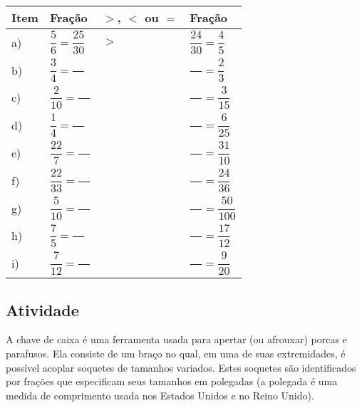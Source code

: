\documentclass[a4,12pt]{book}
\begin{document}
\begin{center}
  \begin{longtable}{|	m{}|m{}|m{}|m{}|}
    \hline
     Item &  Fração &  $>$, $<$ ou $=$ &  Fração \\
    \hline \hline
     a) & \parbox[b][1.2cm][c]{3cm}{ $\dfrac{5}{6} = \dfrac{25}{30}$ } &   $>$  &  $\dfrac{24}{30} = \dfrac{4}{5}$ \\
    \hline
     b) & \parbox[b][1.2cm][c]{3cm}{ $\dfrac{3}{4} = \dfrac{\quad }{\quad }$} &   &  $\dfrac{\quad}{\quad} = \dfrac{2}{3}$ \\
    \hline
     c) &  \parbox[b][1.2cm][c]{3cm}{$\dfrac{2}{10} = \dfrac{\quad }{\quad }$} &   &  $\dfrac{\quad}{\quad} = \dfrac{3}{15}$ \\
    \hline
     d) & \parbox[b][1.2cm][c]{3cm}{ $\dfrac{1}{4} = \dfrac{\quad}{\quad}$} &   &  $\dfrac{\quad}{\quad} = \dfrac{6}{25}$ \\
    \hline
     e) & \parbox[b][1.2cm][c]{3cm}{ $\dfrac{22}{7} = \dfrac{\quad}{\quad}$} &  &  $\dfrac{\quad}{\quad} = \dfrac{31}{10}$ \\
    \hline
     f) & \parbox[b][1.2cm][c]{3cm}{ $\dfrac{22}{33} = \dfrac{\quad}{\quad}$} &   &  $\dfrac{\quad}{\quad} = \dfrac{24}{36}$ \\
    \hline
     g) & \parbox[b][1.2cm][c]{3cm}{ $\dfrac{5}{10} = \dfrac{\quad}{\quad}$} &   &  $\dfrac{\quad}{\quad} = \dfrac{50}{100}$ \\
    \hline
     h) & \parbox[b][1.2cm][c]{3cm}{ $\dfrac{7}{5} = \dfrac{\quad}{\quad}$} &  &  $\dfrac{\quad}{\quad} = \dfrac{17}{12}$ \\
    \hline
     i) & \parbox[b][1.2cm][c]{3cm}{ $\dfrac{7}{12} = \dfrac{\quad}{\quad}$} &  &  $\dfrac{\quad}{\quad} = \dfrac{9}{20}$ \\
    \hline
  \end{longtable}
\end{center}


\subsection{Atividade}


A chave de caixa é uma ferramenta usada para apertar (ou afrouxar) porcas e parafusos. Ela consiste 
de um braço no qual, em uma de suas extremidades, é possível acoplar soquetes de tamanhos variados.
Estes soquetes são identificados por frações que especificam seus tamanhos em polegadas (a polegada é uma medida de comprimento usada nos Estados Unidos e no Reino Unido).
\end{document}
